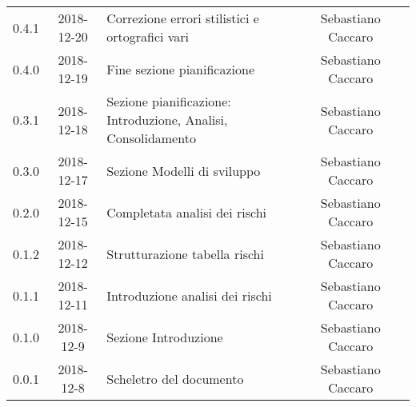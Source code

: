 {\begin{longtable}{ c c  C{4cm}  c  c }
		0.4.1 & 2018-12-20 & Correzione errori stilistici e ortografici vari & Sebastiano Caccaro & \reda{}\\
		
		0.4.0 & 2018-12-19 & Fine sezione pianificazione & Sebastiano Caccaro & \reda{}\\
		
		0.3.1 & 2018-12-18 & Sezione pianificazione: Introduzione, Analisi, Consolidamento & Sebastiano Caccaro & \reda{}\\
		
		0.3.0 & 2018-12-17 & Sezione Modelli di sviluppo & Sebastiano Caccaro & \reda{}\\
				
		0.2.0 & 2018-12-15 & Completata analisi dei rischi & Sebastiano Caccaro & \reda{}\\
				
		0.1.2 & 2018-12-12 & Strutturazione tabella rischi & Sebastiano Caccaro & \reda{}\\
				
		0.1.1 & 2018-12-11 & Introduzione analisi dei rischi & Sebastiano Caccaro & \reda{}\\
				
		0.1.0 & 2018-12-9 & Sezione Introduzione & Sebastiano Caccaro & \reda{}\\
		
		0.0.1 & 2018-12-8 & Scheletro del documento & Sebastiano Caccaro & \reda{}\\
		
	\end{longtable}

}